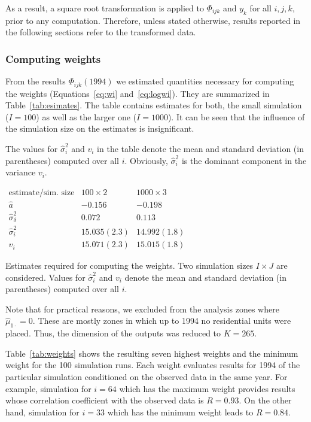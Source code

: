 \documentclass[11pt, fleqn]{article}
\begin{document}
As a result, a square root transformation is applied to $\Phi_{ijk}$ and $y_k$
for all $i,j,k$, prior to any computation. Therefore, unless stated otherwise,
results reported in the following sections refer to the transformed data.

\subsubsection{Computing weights}
\label{sec:weights}
%
From the results $\Phi_{ijk}(1994)$ we estimated quantities necessary for
computing the weights (Equations~\ref{eq:wi} and~\ref{eq:logwi}). They are
summarized in Table~\ref{tab:esimates}. The table contains estimates for both,
the small simulation ($I=100$) as well as the larger one ($I=1000$). It can be
seen that the influence of the simulation size on the estimates is
insignificant.

The values for $\hat{\sigma}^2_{i}$ and $v_i$ in the table denote the mean and
standard deviation (in parentheses) computed over all $i$. Obviously,
$\hat{\sigma}^2_{i}$ is the dominant component in the variance $v_i$.

\begin{table}
\begin{center}
$
\begin{array}{c|rr}
\text{estimate/sim. size} & 100\times 2 & 1000 \times 3\\\hline
\hat{a} & -0.156 & -0.198 \\[1mm]
\hat{\sigma}^2_{\delta} & 0.072 & 0.113\\[1mm]
\hat{\sigma}^2_{i} & 15.035(2.3) & 14.992(1.8) \\[1mm]
v_i & 15.071(2.3) & 15.015(1.8)
\end{array}
$
\end{center}
\caption{\label{tab:esimates}\small Estimates required for computing 
  the weights. Two
  simulation sizes $I\times J$ are considered. Values for $\hat{\sigma}^2_{i}$
  and $v_i$ denote the mean and standard deviation (in parentheses) computed
  over all $i$.}
\end{table}

Note that for practical reasons, we excluded from the analysis zones where
$\hat{\mu}_{1\cdot}=0$. These are mostly zones in which up to 1994 no
residential units were placed. Thus, the dimension of the outputs was reduced
to $K=265$.

Table~\ref{tab:weights} shows the resulting seven highest weights and the
minimum weight for the 100 simulation runs. Each weight evaluates results for
1994 of the particular simulation conditioned on the observed data in the same
year. For example, simulation for $i=64$ which has the maximum weight provides
results whose correlation coefficient with the observed data is $R=0.93$. On
the other hand, simulation for $i=33$ which has the minimum weight leads to
$R=0.84$.
\end{document}
